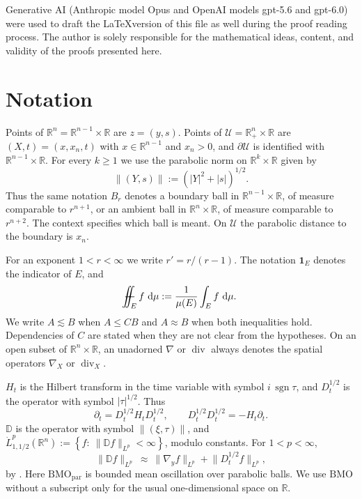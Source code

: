 \documentclass[12pt,leqno]{amsart}
\numberwithin{equation}{section}
\DeclareMathOperator{\divg}{div}
\newcommand{\R}{\mathbb R}
\newcommand{\abs}[1]{\left\vert#1\right\vert}
\newcommand{\br}[1]{\left(#1\right)}
\newcommand{\set}[1]{\left\{#1\right\}}
\newcommand{\pd}{\partial}
\newcommand{\dhalf}{D_t^{1/2}}
\newcommand{\HT}{H_t}
\newcommand{\BMO}{\mathrm{BMO}}
\newcommand{\BMOpar}{\mathrm{BMO}_{\mathrm{par}}}
\newcommand{\Dpar}{\mathbb D}
\newcommand{\Uc}{\mathcal U}
\renewcommand{\d}{\,\mathrm d}
\def\Yint#1{\mathchoice
	{\YYint\displaystyle\textstyle{#1}}%
	{\YYint\textstyle\scriptstyle{#1}}%
	{\YYint\scriptstyle\scriptscriptstyle{#1}}%
	{\YYint\scriptscriptstyle\scriptscriptstyle{#1}}%
	\!\dint}
\newcommand{\dint}{\int\!\!\!\!\!\int}
\def\YYint#1#2#3{{\setbox0=\hbox{$#1{#2#3}{\iint}$}
		\vcenter{\hbox{$#2#3$}}\kern-.51\wd0}}
\def\longdash{\mkern-1.5mu{-}\mkern-7.5mu{-}}
\def\fiint{\Yint\longdash}
\theoremstyle{plain}
\theoremstyle{remark}
\begin{document}
 Generative AI (Anthropic model Opus and OpenAI models gpt-5.6 and gpt-6.0)
were used to draft the \LaTeX version of this file as well during the proof reading process. The author is solely responsible for the mathematical ideas, content, and validity of the proofs presented here.

\section{Notation}\label{S.notation}

Points of $\R^n=\R^{n-1}\times\R$ are $z=(y,s)$.
Points of $\Uc=\R^n_+\times\R$ are $(X,t)=(x,x_n,t)$ with $x\in\R^{n-1}$ and
$x_n>0$, and $\pd\Uc$ is identified with $\R^{n-1}\times\R$. For every
$k\ge1$ we use the parabolic norm on $\R^k\times\R$ given by
\[
 \|(Y,s)\|:=\br{\abs Y^2+\abs s}^{1/2}.
\]
Thus the same notation $B_r$ denotes a boundary ball in
$\R^{n-1}\times\R$, of measure comparable to $r^{n+1}$, or an ambient ball
in $\R^n\times\R$, of measure comparable to $r^{n+2}$. The context specifies
which ball is meant. On $\Uc$ the parabolic distance to the boundary is
$x_n$.

For an exponent $1<r<\infty$ we write $r'=r/(r-1)$. The notation
$\mathbf1_E$ denotes the indicator of $E$, and
\[
 \fiint_E f\,\d\mu:=\frac1{\mu(E)}\int_E f\,\d\mu.
\]
We write $A\lesssim B$ when $A\le CB$ and $A\approx B$ when both inequalities
hold. Dependencies of $C$ are stated when they are not clear from the
hypotheses. On an open subset of $\R^n\times\R$, an unadorned $\nabla$ or
$\divg$ always denotes the spatial operators $\nabla_X$ or $\divg_X$.

$\HT$ is the Hilbert transform in the time variable with symbol
$i\,\operatorname{sgn}\tau$, and $\dhalf$ is the operator with symbol
$\abs\tau^{1/2}$. Thus
\begin{equation}\label{E.algebra}
  \pd_t=\dhalf\HT\dhalf,\qquad \dhalf\dhalf=-\HT\pd_t .
\end{equation}
$\Dpar$ is the operator with symbol $\|(\xi,\tau)\|$, and
$\dot L^p_{1,1/2}(\R^n):=\set{f:\ \|\Dpar f\|_{L^p}<\infty}$, modulo constants.
For $1<p<\infty$,
\begin{equation}\label{E.norms}
  \|\Dpar f\|_{L^p}\ \approx\ \|\nabla_yf\|_{L^p}+\big\|\dhalf f\big\|_{L^p} ,
\end{equation}
by \cite[(2.10)]{DN}. Here $\BMOpar$ is bounded mean oscillation over
parabolic balls. We use $\BMO$ without a subscript only for the usual
one-dimensional space on $\R$.
\end{document}
